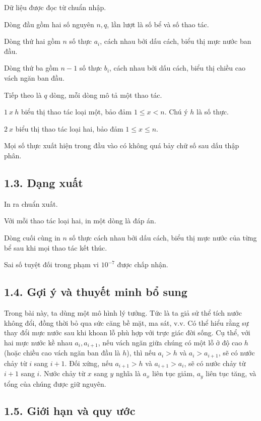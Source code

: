 \documentclass[11pt]{article}
\begin{document}
Dữ liệu được đọc từ chuẩn nhập.

Dòng đầu gồm hai số nguyên \(n,q\), lần lượt là số bể và số thao tác.

Dòng thứ hai gồm \(n\) số thực \(a_i\), cách nhau bởi dấu cách, biểu thị mực
nước ban đầu.

Dòng thứ ba gồm \(n-1\) số thực \(b_i\), cách nhau bởi dấu cách, biểu thị
chiều cao vách ngăn ban đầu.

Tiếp theo là \(q\) dòng, mỗi dòng mô tả một thao tác.

\(1\ x\ h\) biểu thị thao tác loại một, bảo đảm \(1\le x<n\). Chú ý \(h\) là
số thực.

\(2\ x\) biểu thị thao tác loại hai, bảo đảm \(1\le x\le n\).

Mọi số thực xuất hiện trong đầu vào có không quá bảy chữ số sau dấu thập
phân.

\subsection*{1.3. Dạng xuất}

In ra chuẩn xuất.

Với mỗi thao tác loại hai, in một dòng là đáp án.

Dòng cuối cùng in \(n\) số thực cách nhau bởi dấu cách, biểu thị mực nước của
từng bể sau khi mọi thao tác kết thúc.

Sai số tuyệt đối trong phạm vi \(10^{-7}\) được chấp nhận.

\subsection*{1.4. Gợi ý và thuyết minh bổ sung}

Trong bài này, ta dùng một mô hình lý tưởng. Tức là ta giả sử thể tích nước
không đổi, đồng thời bỏ qua sức căng bề mặt, ma sát, v.v. Có thể hiểu rằng
sự thay đổi mực nước sau khi khoan lỗ phù hợp với trực giác đời sống. Cụ thể,
với hai mực nước kề nhau \(a_i,a_{i+1}\), nếu vách ngăn giữa chúng có một lỗ
ở độ cao \(h\) (hoặc chiều cao vách ngăn ban đầu là \(h\)), thì nếu
\(a_i>h\) và \(a_i>a_{i+1}\), sẽ có nước chảy từ \(i\) sang \(i+1\). Đối
xứng, nếu \(a_{i+1}>h\) và \(a_{i+1}>a_i\), sẽ có nước chảy từ \(i+1\) sang
\(i\). Nước chảy từ \(x\) sang \(y\) nghĩa là \(a_x\) liên tục giảm,
\(a_y\) liên tục tăng, và tổng của chúng được giữ nguyên.

\subsection*{1.5. Giới hạn và quy ước}
\end{document}
